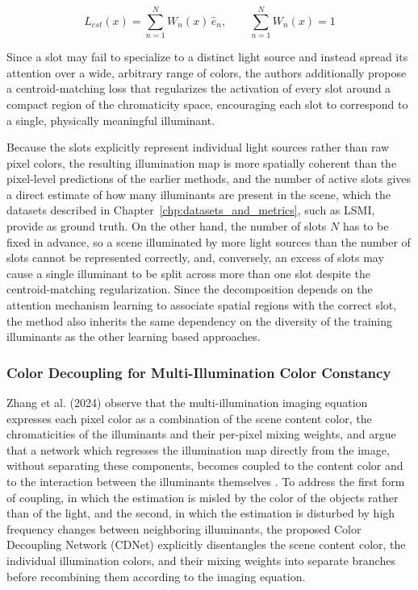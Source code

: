 \begin{equation}
L_{est}(x) = \sum_{n=1}^{N} W_n(x) \, \hat{e}_n, \qquad \sum_{n=1}^{N} W_n(x) = 1
\end{equation}

Since a slot may fail to specialize to a distinct light source and instead spread its attention over a wide, arbitrary range of colors, the authors additionally propose a centroid-matching loss that regularizes the activation of every slot around a compact region of the chromaticity space, encouraging each slot to correspond to a single, physically meaningful illuminant.

Because the slots explicitly represent individual light sources rather than raw pixel colors, the resulting illumination map is more spatially coherent than the pixel-level predictions of the earlier methods, and the number of active slots gives a direct estimate of how many illuminants are present in the scene, which the datasets described in Chapter~\ref{chp:datasets_and_metrics}, such as LSMI, provide as ground truth. On the other hand, the number of slots $N$ has to be fixed in advance, so a scene illuminated by more light sources than the number of slots cannot be represented correctly, and, conversely, an excess of slots may cause a single illuminant to be split across more than one slot despite the centroid-matching regularization. Since the decomposition depends on the attention mechanism learning to associate spatial regions with the correct slot, the method also inherits the same dependency on the diversity of the training illuminants as the other learning based approaches.

\subsubsection{Color Decoupling for Multi-Illumination Color Constancy}

Zhang et al. (2024) observe that the multi-illumination imaging equation expresses each pixel color as a combination of the scene content color, the chromaticities of the illuminants and their per-pixel mixing weights, and argue that a network which regresses the illumination map directly from the image, without separating these components, becomes coupled to the content color and to the interaction between the illuminants themselves \cite{zhang2024color}. To address the first form of coupling, in which the estimation is misled by the color of the objects rather than of the light, and the second, in which the estimation is disturbed by high frequency changes between neighboring illuminants, the proposed Color Decoupling Network (CDNet) explicitly disentangles the scene content color, the individual illumination colors, and their mixing weights into separate branches before recombining them according to the imaging equation.

